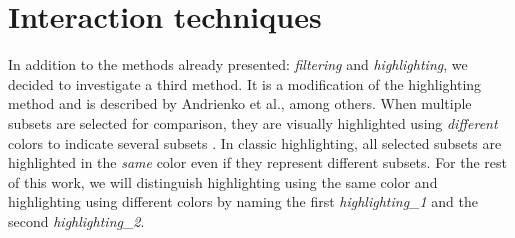 \section{Interaction techniques}
In addition to the methods already presented: \textit{filtering} and \textit{highlighting}, we decided to investigate a third
method. It is a modification of the highlighting method and is described by Andrienko et al., among others. When multiple subsets are selected for
comparison, they are visually highlighted using \textit{different} colors to indicate several subsets \citep*{Andrienko.2020}. In classic highlighting, all selected
subsets are highlighted in the \textit{same} color even if they represent different subsets. For the rest of this work, we will distinguish
highlighting using the same color and highlighting using different colors by naming the first \textit{highlighting\_1} and the second \textit{highlighting\_2}.

